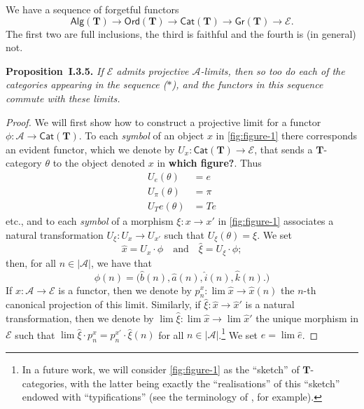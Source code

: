 \documentclass[fleqn]{article}
\newenvironment{itenv}[1]
  {\phantomsection\par\medskip\noindent\textbf{#1.}\itshape}
  {\par\medskip}
\newcommand{\unsure}[1]{{\color{purple}\textbf{#1}}}
\newcommand{\TT}{\mathbf{T}}
\newcommand{\textand}{\quad\text{and}\quad}
\newcommand{\cat}[1]{\mathcal{#1}}
\newcommand{\Cat}[1]{\mathsf{#1}}
\newcommand{\set}[1]{|#1|}
\newcommand{\Gr}[1]{\Cat{Gr}(#1)}
\newcommand{\Alg}[1]{\Cat{Alg}(#1)}
\newcommand{\Ord}[1]{\Cat{Ord}(#1)}
\begin{document}
We have a sequence of forgetful functors
\[
  \Alg{\TT}
  \to \Ord{\TT}
  \to \Cat{Cat}(\TT)
  \to \Gr{\TT}
  \to \cat{E}.
  \tag{$\ast$}
\]
The first two are full inclusions, the third is faithful and the fourth is (in general) not.

\begin{itenv}{Proposition~I.3.5}
  If $\cat{E}$ admits projective $\cat{A}$-limits, then so too do each of the categories appearing in the sequence ($\ast$), and the functors in this sequence commute with these limits.
\end{itenv}

\begin{proof}
  We will first show how to construct a projective limit for a functor $\phi\colon\cat{A}\to\Cat{Cat}(\TT)$.
  To each \emph{symbol} of an object $x$ in \cref{fig:figure-1} there corresponds an evident functor, which we denote by $U_x\colon\Cat{Cat}(\TT)\to\cat{E}$, that sends a $\TT$-category $\theta$ to the object denoted $x$ in \unsure{which figure?}.
  Thus
  \[
    \begin{aligned}
      U_e(\theta)
      &= e
    \\U_\pi(\theta)
      &= \pi
    \\U_Te(\theta)
      &= Te
    \end{aligned}
  \]
  etc., and to each \emph{symbol} of a morphism $\xi\colon x\to x'$ in \cref{fig:figure-1} associates a natural transformation $U_\xi\colon U_x\to U_{x'}$ such that $U_\xi(\theta)=\xi$.
  We set
  \[
    \hat{x} = U_x\cdot\phi
    \textand
    \hat{\xi} = U_\xi\cdot\phi;
  \]
  then, for all $n\in\set{\cat{A}}$, we have that
  \[
    \phi(n)
    = \big(
      \hat{b}(n),
      \hat{a}(n),
      \hat{i}(n),
      \hat{k}(n).
    \big)
  \]
  If $\hat{x}\colon\cat{A}\to\cat{E}$ is a functor, then we denote by $p_n^x\colon\lim\hat{x}\to\hat{x}(n)$ the $n$-th canonical projection of this limit.
  Similarly, if $\hat{\xi}\colon\hat{x}\to\hat{x}'$ is a natural transformation, then we denote by $\lim\hat{\xi}\colon\lim\hat{x}\to\lim\hat{x}'$ the unique morphism in $\cat{E}$ such that $\lim\hat{\xi}\cdot p_n^x=p_n^{x'}\cdot\hat{\xi}(n)$ for all $n\in\set{\cat{A}}$.\footnote{In a future work, we will consider \cref{fig:figure-1} as the ``sketch'' of $\TT$-categories, with the latter being exactly the ``realisations'' of this ``sketch'' endowed with ``typifications'' (see the terminology of \cite{Bu}, for example).}
  We set $e=\lim\hat{e}$.


\end{proof}
\end{document}
